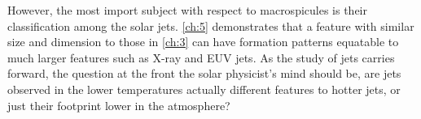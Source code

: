 However, the most import subject with respect to macrospicules is their classification among the solar jets. 
\cref{ch:5} demonstrates that a feature with similar size and dimension to those in \cref{ch:3} can have formation patterns equatable to much larger features such as X-ray and EUV jets.
As the study of jets carries forward, the question at the front the solar physicist's mind should be, are jets observed in the lower temperatures actually different features to hotter jets, or just their footprint lower in the atmosphere?


 


